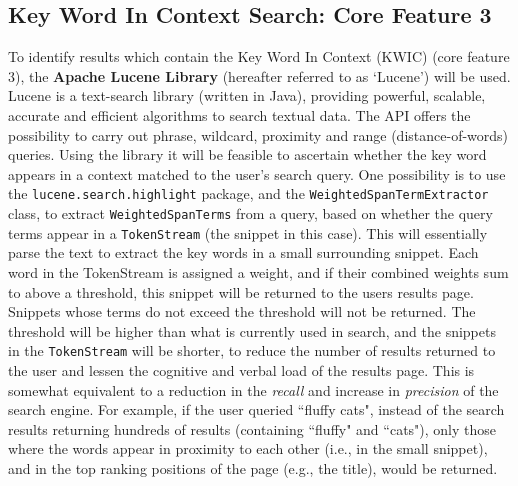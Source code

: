 \documentclass[a4paper, 11pt]{article}
\begin{document}
\begin{justify}
\subsection{Key Word In Context Search: Core Feature 3}\label{apache}
To identify results which contain the Key Word In Context (KWIC)\cite{kwic} (core feature 3), the \textbf{Apache Lucene Library} (hereafter referred to as `Lucene') will be used. Lucene is a text-search library (written in Java), providing powerful, scalable, accurate and efficient algorithms to search textual data. The API offers the possibility to carry out phrase, wildcard, proximity and range (distance-of-words) queries. Using the library it will be feasible to ascertain whether the key word appears in a context matched to the user's search query. One possibility is to use the \texttt{lucene.search.highlight} package, and the \texttt{WeightedSpanTermExtractor} class, to extract \texttt{WeightedSpanTerms} from a query, based on whether the query terms appear in a \texttt{TokenStream} (the snippet in this case). This will essentially parse the text to extract the key words in a small surrounding snippet. Each word in the TokenStream is assigned a weight, and if their combined weights sum to above a threshold, this snippet will be returned to the users results page. Snippets whose terms do not exceed the threshold will not be returned. The threshold will be higher than what is currently used in search, and the snippets in the \texttt{TokenStream} will be shorter, to reduce the number of results returned to the user and lessen the cognitive and verbal load of the results page. This is somewhat equivalent to a reduction in the \textit{recall} and increase in \textit{precision} of the search engine. For example, if the user queried ``fluffy cats", instead of the search results returning hundreds of results (containing ``fluffy" and ``cats"), only those where the words appear in proximity to each other (i.e., in the small snippet), and in the top ranking positions of the page (e.g., the title), would be returned. 


\end{justify}
\end{document}
